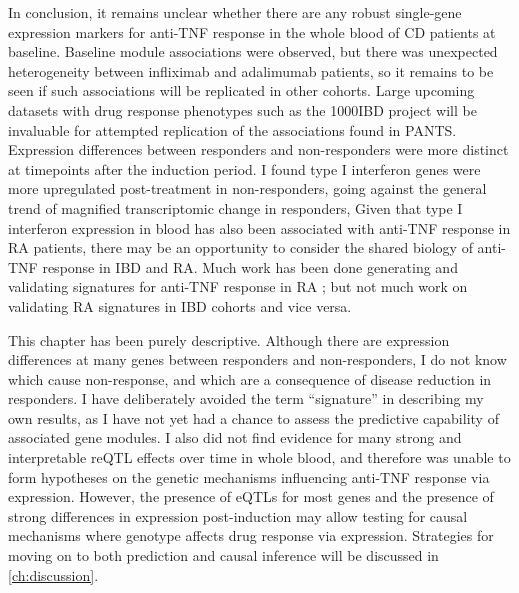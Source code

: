 In conclusion,
it remains unclear whether there are any robust single-gene expression markers for anti-\gls{TNF} response in the whole blood of \gls{CD} patients at baseline.
Baseline module associations were observed, but there was unexpected heterogeneity between infliximab and adalimumab patients,
so it remains to be seen if such associations will be replicated in other cohorts.
Large upcoming datasets with drug response phenotypes such as the 1000IBD project \autocite{imhann20191000IBDProjectMultiomics} will be invaluable for attempted replication of the associations found in \gls{PANTS}.
Expression differences between responders and non-responders were more distinct at timepoints after the induction period.
I found type I interferon genes were more upregulated post-treatment in non-responders,
going against the general trend of magnified transcriptomic change in responders,
Given that type I interferon expression in blood has also been associated with anti-\gls{TNF} response in \gls{RA} patients,
there may be an opportunity to consider the shared biology of anti-\gls{TNF} response in \gls{IBD} and \gls{RA}.
Much work has been done generating and validating signatures for anti-\gls{TNF} response in \gls{RA} \autocite{toonen2012ValidationStudyExisting}; but not much work on validating \gls{RA} signatures in \gls{IBD} cohorts and vice versa.

This chapter has been purely descriptive.
Although there are expression differences at many genes between responders and non-responders,
I do not know which cause non-response,
and which are a consequence of disease reduction in responders.
I have deliberately avoided the term \enquote{signature} in describing my own results, 
as I have not yet had a chance to assess the predictive capability of associated gene modules.
I also did not find evidence for many strong and interpretable \gls{reQTL} effects over time in whole blood, 
and therefore was unable to form hypotheses on the genetic mechanisms influencing anti-\gls{TNF} response via expression.
However, the presence of \glspl{eQTL} for most genes and the presence of strong differences in expression post-induction may allow testing for causal mechanisms where genotype affects drug response via expression.
Strategies for moving on to both prediction and causal inference will be discussed in \cref{ch:discussion}.
%
